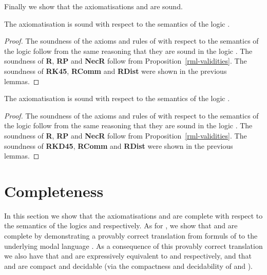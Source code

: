Finally we show that the axiomatisations \axiomRmlKFF{} and \axiomRmlKD{} are sound.

\begin{lemma}\label{rml-kff-sound}
The axiomatisation \axiomRmlKFF{} is sound with respect to the semantics of the logic \logicRmlKFF{}.
\end{lemma}

\begin{proof}
The soundness of the axioms and rules of \axiomKFF{} with respect to the semantics of the logic \logicRmlKFF{} follow from the same reasoning that they are sound in the logic \logicKFF{}.
The soundness of {\bf R}, {\bf RP} and {\bf NecR} follow from Proposition~\ref{rml-validities}.
The soundness of {\bf RK45}, {\bf RComm} and {\bf RDist} were shown in the previous lemmas.
\end{proof}

\begin{lemma}\label{rml-kd-sound}
The axiomatisation \axiomRmlKD{} is sound with respect to the semantics of the logic \logicRmlKD{}.
\end{lemma}

\begin{proof}
The soundness of the axioms and rules of \axiomKD{} with respect to the semantics of the logic \logicRmlKD{} follow from the same reasoning that they are sound in the logic \logicKD{}.
The soundness of {\bf R}, {\bf RP} and {\bf NecR} follow from Proposition~\ref{rml-validities}.
The soundness of {\bf RKD45}, {\bf RComm} and {\bf RDist} were shown in the previous lemmas.
\end{proof}

\section{Completeness}\label{rml-kd45-completeness}

In this section we show that the axiomatisations \axiomRmlKFF{} and \axiomRmlKD{} are complete with respect to the semantics of the logics \logicRmlKFF{} and \axiomRmlKD{} respectively.
As for \axiomRmlK{}, we show that \axiomRmlKFF{} and \axiomRmlKD{} are complete by demonstrating a provably correct translation from formuls of \langRml{} to the underlying modal language \langMl{}.
As a consequence of this provably correct translation we also have that \logicRmlKFF{} and \logicRmlKD{} are expressively equivalent to \logicKFF{} and \logicRmlKD{} respectively, and that \logicRmlKFF{} and \logicRmlKD{} are compact and decidable (via the compactness and decidability of \logicKFF{} and \logicKD{}).

